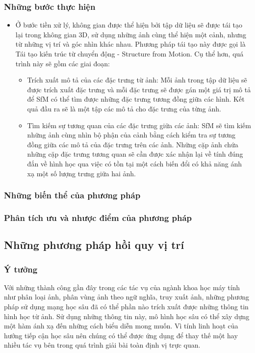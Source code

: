 \subsubsection*{Những bước thực hiện}
\begin{itemize}
    \item Ở bước tiền xử lý, không gian được thể hiện bởi tập dữ liệu sẽ được tái tạo lại trong không gian 3D, sử dụng những ảnh cùng thể hiện một cảnh, nhưng từ những vị trí và góc nhìn khác nhau. Phương pháp tái tạo này được gọi là Tái tạo kiến trúc từ chuyển động - Structure from Motion. Cụ thể hơn, quá trình này sẽ gồm các giai đoạn:
    \begin{itemize}
        \item Trích xuất mô tả của các đặc trưng từ ảnh: Mỗi ảnh trong tập dữ liệu sẽ được trích xuất đặc trưng và mỗi đặc trưng sẽ được gán một giá trị mô tả để SfM có thể tìm được những đặc trưng tương đồng giữa các hình. Kết quả đầu ra sẽ là một tập các mô tả cho đặc trưng của từng ảnh.
        \item Tìm kiếm sự tương quan của các đặc trưng giữa các ảnh: SfM sẽ tìm kiếm những ảnh cùng nhìn bộ phận của cảnh bằng cách kiểm tra sự tương đồng giữa các mô tả của đặc trưng trên các ảnh. Những cặp ảnh chứa những cặp đặc trưng tương quan sẽ cần được xác nhận lại về tính đúng đắn về hình học qua việc có tồn tại một cách biến đổi có khả năng ánh xạ một số lượng trưng giữa hai ảnh.
    \end{itemize}
\end{itemize}
\subsubsection*{Những biến thể của phương pháp}
\subsubsection*{Phân tích ưu và nhược điểm của phương pháp}

\subsection{Những phương pháp hồi quy vị trí}
\subsubsection*{Ý tưởng}
Với những thành công gần đây trong các tác vụ của ngành khoa học máy tính như phân loại ảnh, phân vùng ảnh theo ngữ nghĩa, truy xuất ảnh, những phương pháp sử dụng mạng học sâu đã có thể phần nào trích xuất được những thông tin hình học từ ảnh. Sử dụng những thông tin này, mô hình học sâu có thể xây dựng một hàm ánh xạ đến những cách biểu diễn mong muốn. Vì tính linh hoạt của hướng tiếp cận học sâu nên chúng có thể được ứng dụng để thay thế một hay nhiều tác vụ bên trong quá trình giải bài toàn định vị trực quan.
